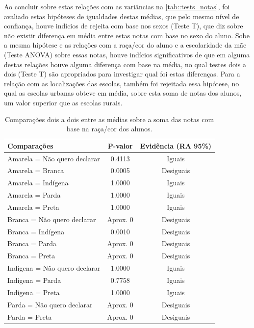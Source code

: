 Ao concluir sobre estas relações com as variâncias na \autoref{tab::tests_notas}, foi avaliado estas
hipóteses de igualdades destas médias, que pelo mesmo nível de confiança, houve indícios de rejeita 
com base nos sexos (Teste T), que diz sobre não existir diferença em média entre estas notas com base no 
sexo do aluno. Sobe a mesma hipótese e as relações com a raça/cor do aluno e a escolaridade da mãe (Teste ANOVA)
sobre essas notas, houve indícios significativos de que em alguma destas relações houve alguma diferença 
com base na média, no qual testes dois a dois (Teste T) são apropriados para investigar qual foi estas diferenças.
Para a relação com as localizações das escolas, também foi rejeitada essa hipótese, no qual as escolas 
urbanas obteve em média, sobre esta soma de notas dos alunos, um valor superior que as escolas rurais.


\newpage

\begin{table}[htb]
    \centering
\caption{Comparações dois a dois entre as médias sobre a soma das notas
        com base na raça/cor dos alunos.\label{tab:raca_cor_notas}}
    \begin{tabular}{lcc}
    \toprule
    Comparações & P-valor & Evidência (RA 95\%)\\
    \midrule \midrule
    Amarela = Não quero declarar & 0.4113 & Iguais\\
    Amarela = Branca & 0.0005 & Desiguais\\
    Amarela = Indígena & 1.0000 & Iguais\\
    Amarela = Parda & 1.0000 & Iguais\\
    Amarela = Preta & 1.0000 & Iguais\\
    Branca = Não quero declarar & Aprox. 0 & Desiguais\\
    Branca = Indígena & 0.0010 & Desiguais\\
    Branca = Parda & Aprox. 0 & Desiguais\\
    Branca = Preta & Aprox. 0 & Desiguais\\
    Indígena = Não quero declarar & 1.0000 & Iguais\\
    Indígena = Parda & 0.7758 & Iguais\\
    Indígena = Preta & 1.0000  & Iguais\\
    Parda = Não quero declarar & Aprox. 0 & Desiguais\\
    Parda = Preta & Aprox. 0 & Desiguais\\
    \bottomrule
    \end{tabular}
    \centering
    
\end{table}

